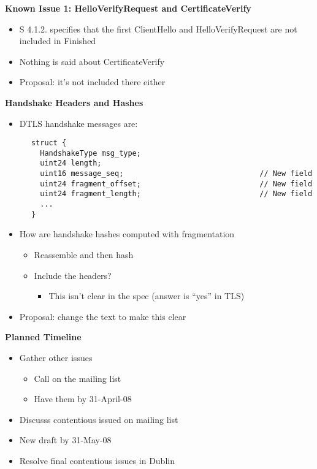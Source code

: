 \documentclass[helvetica]{seminar}
\newcommand{\heading}[1]{%
  \begin{center} 
    \large\bf 
    #1 
  \end{center} 
  \vspace{.4 in}}
\begin{document}
\begin{slide}
\heading{Known Issue 1: HelloVerifyRequest and CertificateVerify}

\begin{itemize}
\item S 4.1.2. specifies that the first ClientHello and HelloVerifyRequest
               are not included in Finished
\item Nothing is said about CertificateVerify
\item Proposal: it's not included there either        
\end{itemize}
\end{slide}


\begin{slide}
\heading{Handshake Headers and Hashes}

\vspace{-.5 in}

\begin{itemize}
\item DTLS handshake messages are:
\end{itemize}

{\small
\begin{verbatim}
      struct {
        HandshakeType msg_type;
        uint24 length;
        uint16 message_seq;                               // New field
        uint24 fragment_offset;                           // New field
        uint24 fragment_length;                           // New field
        ...
      }
\end{verbatim}
}

\begin{itemize}
\item How are handshake hashes computed with fragmentation
\begin{itemize}
\item Reassemble and then hash
\item Include the headers? 
\begin{itemize}
\item This isn't clear in the spec (answer is ``yes'' in TLS)
\end{itemize}
\end{itemize}
\item Proposal: change the text to make this clear
\end{itemize}
\end{slide}



\begin{slide}
\heading{Planned Timeline}

\begin{itemize}
\item Gather other issues
\begin{itemize}
\item Call on the mailing list
\item Have them by 31-April-08
\end{itemize}
\item Discusss contentious issued on mailing list
\item New draft by 31-May-08
\item Resolve final contentious issues in Dublin
\end{itemize}
\end{slide}
\end{document}
